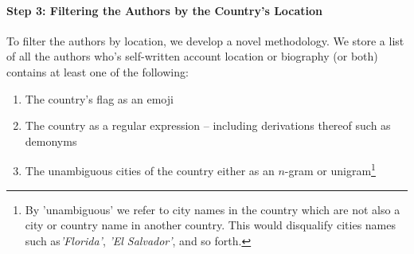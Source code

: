             
            
    
        \paragraph{Step 3: Filtering the Authors by the Country’s Location}
        
        \newline\indent
        
        
        To filter the authors by location, we develop a novel methodology. We store a list of all the authors 
        who's self-written account location or biography (or both) contains at least one of the following:
            \begin{enumerate}
                \item 
                The country's flag as an emoji
                
                \item
                The country as a regular expression -- including derivations thereof such as demonyms
                
                \item
                The unambiguous cities of the country either as an $n$-gram or unigram\footnote{By 'unambiguous' we refer to city names in the country which are not also a city or country name in another country. This would disqualify cities names such as{\it 'Florida'}, {\it 'El Salvador'}, and so forth.} 
            \end{enumerate}

